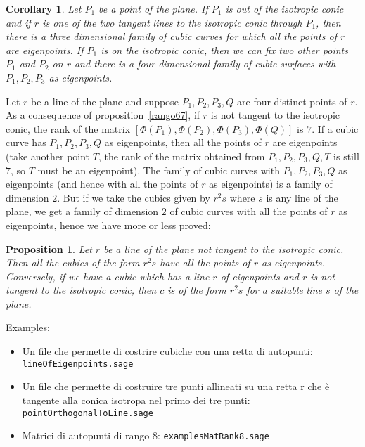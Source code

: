 \documentclass{amsart}
\theoremstyle{plain}
\newtheorem{prop}[theorem]{Proposition}
\newtheorem{cor}[theorem]{Corollary}
\theoremstyle{definition}
\begin{document}
\begin{cor}
  Let $P_1$ be a point of the plane. If $P_1$ is out of the isotropic
  conic and if $r$ is
  one of the two tangent lines to the isotropic conic through $P_1$, then
  there is a three dimensional family of cubic curves for which all the
  points of $r$ are eigenpoints. If $P_1$ is on the isotropic conic,
  then we can fix two other points $P_1$ and $P_2$ on $r$ and there is a
  four dimensional family of cubic surfaces with $P_1, P_2, P_3$ as
  eigenpoints. 
\end{cor}

  Let $r$ be a line of the plane and suppose $P_1, P_2, P_3, Q$ are four
  distinct points of $r$. As a consequence of proposition~\ref{rango67}, 
  if $r$ is not tangent to the isotropic conic, the rank of the
  matrix $[\Phi(P_1), \Phi(P_2), \Phi(P_3), \Phi(Q)]$ is $7$. If a cubic
  curve has $P_1, P_2, P_3, Q$ as eigenpoints, then all the points of
  $r$ are eigenpoints (take another point $T$, the rank of the matrix
  obtained from $P_1, P_2, P_3, Q, T$ is still $7$, so $T$ must be an
  eigenpoint). The family of cubic curves with $P_1, P_2, P_3, Q$ as
  eigenpoints (and hence with all the points of $r$ as eigenpoints)
  is a family of dimension $2$. But if we take the cubics given by
  $r^2s$ where $s$ is any line of the plane, we get a family of dimension
  $2$ of cubic curves with all the points of $r$ as eigenpoints, hence
  we have more or less proved:
  \begin{prop}
    Let $r$ be a line of the plane not tangent to the isotropic conic.
    Then all the cubics of the form $r^2s$ have all the points of $r$
    as eigenpoints. Conversely, if we have a cubic which has a line $r$
    of eigenpoints and $r$ is not tangent to the isotropic conic, then
    $c$ is of the form $r^2s$ for a suitable line $s$ of the plane. 
  \end{prop}


  Examples:
  \begin{itemize}
    \item Un file che permette di costrire cubiche con una retta di
      autopunti: \\
      \texttt{lineOfEigenpoints.sage}
    \item Un file che permette di costruire tre punti allineati su una
      retta r che \`e tangente alla conica isotropa nel primo dei tre
      punti: \\
      \texttt{pointOrthogonalToLine.sage}
    \item Matrici di autopunti di rango 8:
      \texttt{examplesMatRank8.sage}
\end{itemize}
\end{document}
